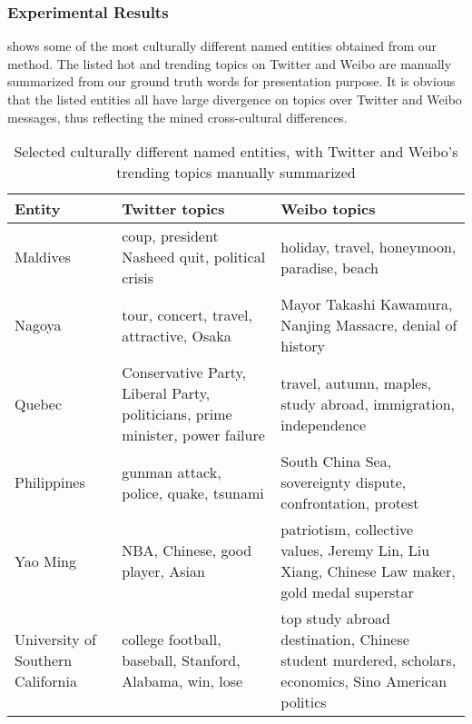 \subsubsection{Experimental Results}
 shows some of the most culturally different named entities obtained from our method. The listed hot and trending topics on Twitter and Weibo are manually summarized from our ground truth words for presentation purpose. It is obvious that the listed entities all have large divergence on topics over Twitter and Weibo messages, thus reflecting the mined cross-cultural differences.
\begin{table}[ht]
	\scriptsize
	\centering
	\caption{\small Selected culturally different named entities, with Twitter and Weibo's trending topics manually summarized}
	\begin{tabular}{|L{1.2cm}|L{3cm}|L{3cm}|}
		\hline
		\textbf{Entity} & \textbf{Twitter topics} & \textbf{Weibo topics}
		\\ \hline
		Maldives & coup, president Nasheed quit, political crisis & holiday, travel, honeymoon, paradise, beach \\ \hline
		Nagoya & tour, concert, travel, attractive, Osaka & Mayor Takashi Kawamura, Nanjing Massacre, denial of history\\  \hline
		Quebec & Conservative Party, Liberal Party, politicians, prime minister, power failure & travel, autumn, maples, study abroad, immigration, independence   \\ \hline
		Philippines & gunman attack, police, quake, tsunami & South China Sea, sovereignty dispute, confrontation, protest  \\ \hline
		Yao Ming & NBA, Chinese, good player, Asian  & patriotism, collective values, Jeremy Lin, Liu Xiang, Chinese Law maker, gold medal superstar   \\ \hline
		University of Southern California & college football, baseball, Stanford, Alabama, win, lose & top study abroad destination, Chinese student murdered, scholars, economics, Sino American politics \\ \hline
	\end{tabular}
	\label{tab:mcdne_res_4}
\end{table}

